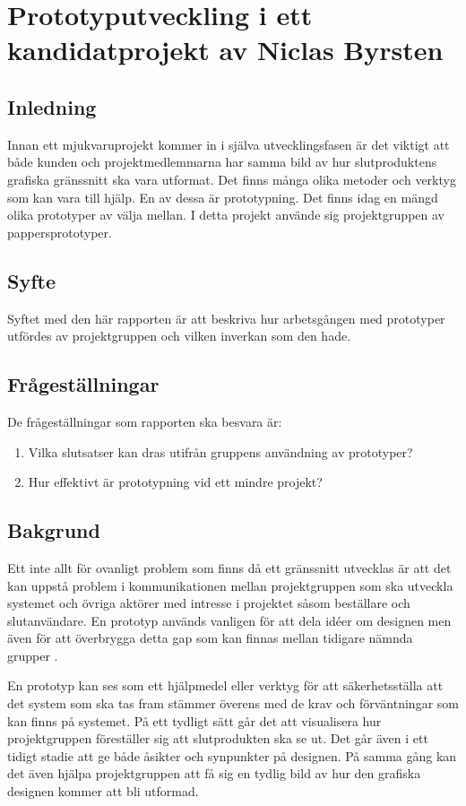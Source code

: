 \chapter{Prototyputveckling i ett kandidatprojekt av Niclas Byrsten}\label{appendix:prototyp}

\section{Inledning}
Innan ett mjukvaruprojekt kommer in i själva utvecklingsfasen är det viktigt att både kunden och projektmedlemmarna har samma bild av hur slutproduktens grafiska gränssnitt ska vara utformat. Det finns många olika metoder och verktyg som kan vara till hjälp. En av dessa är prototypning. Det finns idag en mängd olika prototyper av välja mellan. I detta projekt använde sig projektgruppen av pappersprototyper.  

\section{Syfte}
Syftet med den här rapporten är att beskriva hur arbetsgången med prototyper utfördes av projektgruppen och vilken inverkan som den hade.
\section{Frågeställningar}
De frågeställningar som rapporten ska besvara är:
\begin{enumerate}
    \item Vilka slutsatser kan dras utifrån gruppens användning av prototyper? 
    \item Hur effektivt är prototypning vid ett mindre projekt?
\end{enumerate}

\section{Bakgrund}
Ett inte allt för ovanligt problem som finns då ett gränssnitt utvecklas är att det kan uppstå problem i kommunikationen mellan projektgruppen som ska utveckla systemet och övriga aktörer med intresse i projektet såsom beställare och slutanvändare. En prototyp används vanligen för att dela idéer om designen men även för att överbrygga detta gap som kan finnas mellan tidigare nämnda grupper \cite{caseStudy}. 

En prototyp kan ses som ett hjälpmedel eller verktyg för att säkerhetsställa att det system som ska tas fram stämmer överens med de krav och förväntningar som kan finns på systemet. På ett tydligt sätt går det att visualisera hur projektgruppen föreställer sig att slutprodukten ska se ut. Det går även i ett tidigt stadie att ge både åsikter och synpunkter på designen. På samma gång kan det även hjälpa projektgruppen att få sig en tydlig bild av hur den grafiska designen kommer att bli utformad. 


